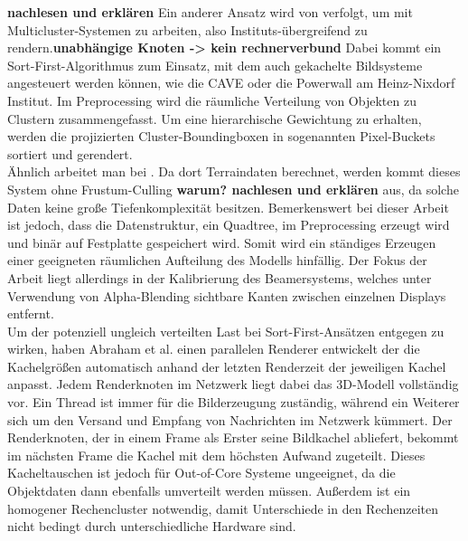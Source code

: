 \textbf{nachlesen und erklären} Ein anderer Ansatz wird von \cite{dpbp} verfolgt, um mit Multicluster-Systemen zu arbeiten, also Instituts-übergreifend zu rendern.\textbf{unabhängige Knoten -> kein rechnerverbund} Dabei kommt ein Sort-First-Algorithmus zum Einsatz, mit dem auch gekachelte Bildsysteme angesteuert werden können, wie die CAVE \cite{cave} oder die Powerwall am Heinz-Nixdorf Institut. Im Preprocessing wird die räumliche Verteilung von Objekten zu Clustern zusammengefasst. Um eine hierarchische Gewichtung zu erhalten, werden die projizierten Cluster-Boundingboxen in sogenannten Pixel-Buckets sortiert und gerendert.\\
Ähnlich arbeitet man bei \cite{DBLP:journals/ijvr/YinJSZ06}. Da dort Terraindaten berechnet, werden kommt dieses System ohne Frustum-Culling \textbf{warum? nachlesen und erklären} aus, da solche Daten keine große Tiefenkomplexität besitzen. Bemerkenswert bei dieser Arbeit ist jedoch, dass die Datenstruktur, ein Quadtree, im Preprocessing erzeugt wird und binär auf Festplatte gespeichert wird. Somit wird ein ständiges Erzeugen einer geeigneten räumlichen Aufteilung des Modells hinfällig. Der Fokus der Arbeit liegt allerdings in der Kalibrierung des Beamersystems, welches unter Verwendung von Alpha-Blending sichtbare Kanten zwischen einzelnen Displays entfernt.\\
Um der potenziell ungleich verteilten Last bei Sort-First-Ansätzen entgegen zu wirken, haben Abraham et al. \cite{abraham} einen parallelen Renderer entwickelt der die Kachelgrößen automatisch anhand der letzten Renderzeit der jeweiligen Kachel anpasst. Jedem Renderknoten im Netzwerk liegt dabei das 3D-Modell vollständig vor. Ein Thread ist immer für die Bilderzeugung zuständig, während ein Weiterer sich um den Versand und Empfang von Nachrichten im Netzwerk kümmert. Der Renderknoten, der in einem Frame als Erster seine Bildkachel abliefert, bekommt im nächsten Frame die Kachel mit dem höchsten Aufwand zugeteilt. Dieses Kacheltauschen ist jedoch für Out-of-Core Systeme ungeeignet, da die Objektdaten dann ebenfalls umverteilt werden müssen. Außerdem ist ein homogener Rechencluster notwendig, damit Unterschiede in den Rechenzeiten nicht bedingt durch unterschiedliche Hardware sind.

